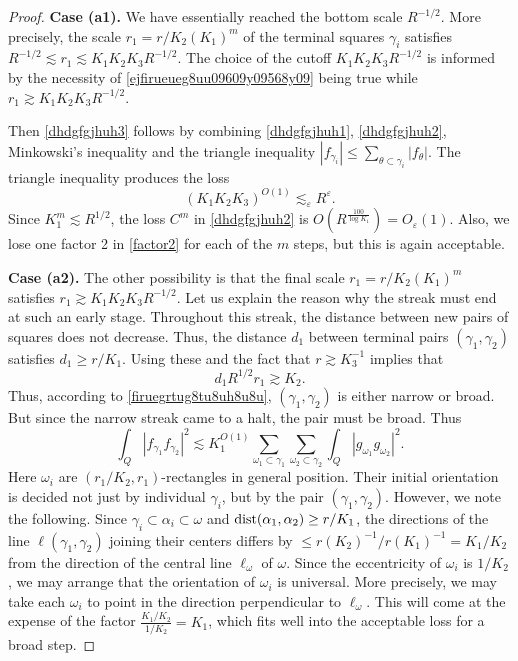 \documentclass{amsart}%
\numberwithin{equation}{section}
\newcommand{\e}{\varepsilon}
\newcommand{\1}{\mathbbm{1}}
\newcommand{\dist}{{\rm dist}}
\begin{document}
\begin{proof}
	    {\bf Case (a1).} We have essentially reached the bottom scale $R^{-1/2}$. More precisely, the scale $r_1=r/K_2(K_1)^m$ of the terminal squares $\gamma_i$ satisfies $R^{-1/2}\lesssim r_1\lesssim K_1K_2K_3R^{-1/2}$. The choice of the cutoff $K_1K_2K_3R^{-1/2}$ is informed by the necessity of \eqref{ejfirueueg8uu09609y09568y09} being true while $r_1\gtrsim K_1K_2K_3R^{-1/2}$.
		
		
			Then  \eqref{dhdgfgjhuh3} follows by combining \eqref{dhdgfgjhuh1}, \eqref{dhdgfgjhuh2}, Minkowski's inequality and the triangle inequality 
		$|f_{\gamma_i}|\le \sum_{\theta\subset \gamma_i}|f_\theta|$.
		The triangle inequality produces the loss 
		\begin{equation}
		\label{cjrecfuugug965uy09u}
		(K_1K_2K_3)^{O(1)}\lesssim_\e R^\e.
		\end{equation}
		Since $K_1^m\lesssim R^{1/2}$, the loss $C^m$ in \eqref{dhdgfgjhuh2} is $O(R^{\frac{100}{\log K_1}})=O_\e(1)$. Also, we lose one factor 2 in \eqref{factor2} for each of the $m$ steps, but this is again acceptable.
	\medskip
		
		{\bf Case (a2).} The other possibility is that the final scale $r_1=r/K_2(K_1)^m$ satisfies $r_1\gtrsim K_1K_2K_3 R^{-1/2}$. Let us explain the reason why the streak must end at such an early stage. Throughout this streak, the distance between new pairs of squares does not decrease. Thus, the distance $d_1$ between terminal pairs $(\gamma_1,\gamma_2)$ satisfies $d_1\ge r/K_1$.
		Using these and the fact that $r\gtrsim K_3^{-1}$ implies that
		\begin{equation}
		\label{ejfirueueg8uu09609y09568y09}
		d_1 R^{1/2}r_1\gtrsim K_2.
		\end{equation}
		Thus, according to \eqref{firuegrtug8tu8uh8u8u},  $(\gamma_1,\gamma_2)$ is  either narrow or broad. But since the narrow streak came to a halt, the pair must be broad. Thus 
		\begin{equation}
        \label{vjgurtiyo0uoj0-ok-}
			\int_{Q}|f_{\gamma_1}f_{\gamma_2}|^2\lesssim K_1^{O(1)}\sum_{\omega_1\subset \gamma_1}\sum_{\omega_2\subset \gamma_2}\int_{Q}|g_{\omega_1}g_{\omega_2}|^2.
		\end{equation}
		Here $\omega_i$ are $(r_1/K_2,r_1)$-rectangles in general position. Their initial orientation is decided not just by individual $\gamma_i$, but by the pair $(\gamma_1,\gamma_2)$. 
        However, we note the following.
        Since $\gamma_i\subset \alpha_i\subset \omega$ and $\dist(\alpha_1,\alpha_2)\ge r/K_1$, the directions of the line $\ell(\gamma_1,\gamma_2)$ joining their centers differs by  $\le r(K_2)^{-1}/r(K_1)^{-1}=K_1/K_2$ from the direction of the central line $\ell_\omega$ of $\omega$.
        Since the eccentricity of $\omega_i$ is $1/K_2$, we may arrange that the orientation of $\omega_i$ is universal. 
        More precisely, we may take each $\omega_i$ to point in the direction perpendicular to $\ell_\omega$. This will come at the expense of the factor $\frac{K_1/K_2}{1/K_2}=K_1$, which fits well into the acceptable loss for a broad step. 
		

\end{proof}
\end{document}

